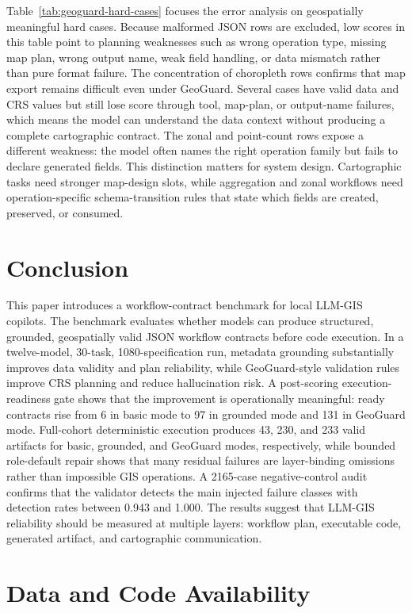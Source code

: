 \documentclass[12pt]{gsis}  %
\begin{document}
Table~\ref{tab:geoguard-hard-cases} focuses the error analysis on geospatially meaningful hard cases. Because malformed JSON rows are excluded, low scores in this table point to planning weaknesses such as wrong operation type, missing map plan, wrong output name, weak field handling, or data mismatch rather than pure format failure. The concentration of choropleth rows confirms that map export remains difficult even under GeoGuard. Several cases have valid data and CRS values but still lose score through tool, map-plan, or output-name failures, which means the model can understand the data context without producing a complete cartographic contract. The zonal and point-count rows expose a different weakness: the model often names the right operation family but fails to declare generated fields. This distinction matters for system design. Cartographic tasks need stronger map-design slots, while aggregation and zonal workflows need operation-specific schema-transition rules that state which fields are created, preserved, or consumed.

\section{Conclusion}

This paper introduces a workflow-contract benchmark for local LLM-GIS copilots. The benchmark evaluates whether models can produce structured, grounded, geospatially valid JSON workflow contracts before code execution. In a twelve-model, 30-task, 1080-specification run, metadata grounding substantially improves data validity and plan reliability, while GeoGuard-style validation rules improve CRS planning and reduce hallucination risk. A post-scoring execution-readiness gate shows that the improvement is operationally meaningful: ready contracts rise from 6 in basic mode to 97 in grounded mode and 131 in GeoGuard mode. Full-cohort deterministic execution produces 43, 230, and 233 valid artifacts for basic, grounded, and GeoGuard modes, respectively, while bounded role-default repair shows that many residual failures are layer-binding omissions rather than impossible GIS operations. A 2165-case negative-control audit confirms that the validator detects the main injected failure classes with detection rates between 0.943 and 1.000. The results suggest that LLM-GIS reliability should be measured at multiple layers: workflow plan, executable code, generated artifact, and cartographic communication.

\section*{Data and Code Availability}
\end{document}
